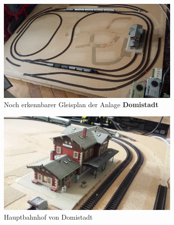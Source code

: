 \begin{figure}[h]
\centering
	\begin{subfigure}[b]{0.49\textwidth}
    \includegraphics[width=1.0\textwidth]{img/elder_maps/domistadt_map.jpg}
   \caption{Noch erkennbarer Gleisplan der Anlage \textbf{Domistadt}}
    \label{img:elder_maps_domistadt_map}
    \end{subfigure}
	\begin{subfigure}[b]{0.49\textwidth}
    \includegraphics[width=1.0\textwidth]{img/elder_maps/domistadt_bhf.jpg}
   \caption{Hauptbahnhof von Domistadt}
    \label{img:elder_maps_domistadt_bhf}
    \end{subfigure}
		\begin{subfigure}[b]{0.49\textwidth}

\end{subfigure}
\end{figure}
